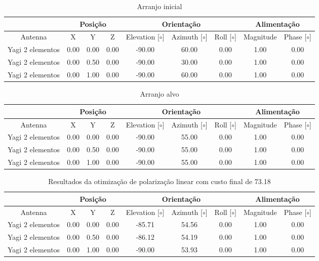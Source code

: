 \begin{table}[H]
    \centering
    \tiny
    \begin{tabular}{c|c|c|c|c|c|c|c|c}
         & \multicolumn{3}{|c|}{Posição} & \multicolumn{3}{|c|}{Orientação} & \multicolumn{2}{|c}{Alimentação} \\
         \hline
        Antenna & X & Y & Z & Elevation [$\circ$] & Azimuth [$\circ$] & Roll [$\circ$] & Magnitude & Phase [$\circ$] \\
        \hline
        Yagi 2 elementos & 0.00 & 0.00 & 0.00 & -90.00 & 60.00 & 0.00 & 1.00 & 0.00 \\
        Yagi 2 elementos & 0.00 & 0.50 & 0.00 & -90.00 & 30.00 & 0.00 & 1.00 & 0.00 \\
        Yagi 2 elementos & 0.00 & 1.00 & 0.00 & -90.00 & 60.00 & 0.00 & 1.00 & 0.00 \\
    \end{tabular}
    \caption{Arranjo inicial}
    \label{tab:Arranjo Arranjo inicial - otimização linear}
\end{table}
\begin{table}[H]
    \centering
    \tiny
    \begin{tabular}{c|c|c|c|c|c|c|c|c}
         & \multicolumn{3}{|c|}{Posição} & \multicolumn{3}{|c|}{Orientação} & \multicolumn{2}{|c}{Alimentação} \\
         \hline
        Antenna & X & Y & Z & Elevation [$\circ$] & Azimuth [$\circ$] & Roll [$\circ$] & Magnitude & Phase [$\circ$] \\
        \hline
        Yagi 2 elementos & 0.00 & 0.00 & 0.00 & -90.00 & 55.00 & 0.00 & 1.00 & 0.00 \\
        Yagi 2 elementos & 0.00 & 0.50 & 0.00 & -90.00 & 55.00 & 0.00 & 1.00 & 0.00 \\
        Yagi 2 elementos & 0.00 & 1.00 & 0.00 & -90.00 & 55.00 & 0.00 & 1.00 & 0.00 \\
    \end{tabular}
    \caption{Arranjo alvo}
    \label{tab:Arranjo Arranjo alvo de polarização linear - otimização linear}
\end{table}
\begin{table}[H]
    \centering
    \tiny
    \begin{tabular}{c|c|c|c|c|c|c|c|c}
         & \multicolumn{3}{|c|}{Posição} & \multicolumn{3}{|c|}{Orientação} & \multicolumn{2}{|c}{Alimentação} \\
         \hline
        Antenna & X & Y & Z & Elevation [$\circ$] & Azimuth [$\circ$] & Roll [$\circ$] & Magnitude & Phase [$\circ$] \\
        \hline
        Yagi 2 elementos & 0.00 & 0.00 & 0.00 & -85.71 & 54.56 & 0.00 & 1.00 & 0.00 \\
        Yagi 2 elementos & 0.00 & 0.50 & 0.00 & -86.12 & 54.19 & 0.00 & 1.00 & 0.00 \\
        Yagi 2 elementos & 0.00 & 1.00 & 0.00 & -90.00 & 53.93 & 0.00 & 1.00 & 0.00 \\
    \end{tabular}
    \caption{Resultados da otimização de polarização linear com custo final de 73.18}
    \label{tab:Arranjo Arranjo final otimizado - otimização linear}
\end{table}
